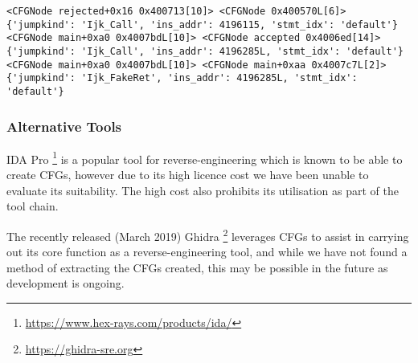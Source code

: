\begin{lstlisting}[caption={An excerpt from the results of an angr CFG analysis of the file `fauxware'},label={lst:angr_result}]
<CFGNode rejected+0x16 0x400713[10]> <CFGNode 0x400570L[6]> {'jumpkind': 'Ijk_Call', 'ins_addr': 4196115, 'stmt_idx': 'default'}
<CFGNode main+0xa0 0x4007bdL[10]> <CFGNode accepted 0x4006ed[14]> {'jumpkind': 'Ijk_Call', 'ins_addr': 4196285L, 'stmt_idx': 'default'}
<CFGNode main+0xa0 0x4007bdL[10]> <CFGNode main+0xaa 0x4007c7L[2]> {'jumpkind': 'Ijk_FakeRet', 'ins_addr': 4196285L, 'stmt_idx': 'default'}
\end{lstlisting}

\subsubsection*{Alternative Tools}

IDA Pro \footnote{\url{https://www.hex-rays.com/products/ida/}} is a popular tool for reverse-engineering which is known to be able to create CFGs, however due to its high licence cost we have been unable to evaluate its suitability. The high cost also prohibits its utilisation as part of the tool chain.

The recently released (March 2019) Ghidra \footnote{\url{https://ghidra-sre.org}} leverages CFGs to assist in carrying out its core function as a reverse-engineering tool, and while we have not found a method of extracting the CFGs created, this may be possible in the future as development is ongoing.
